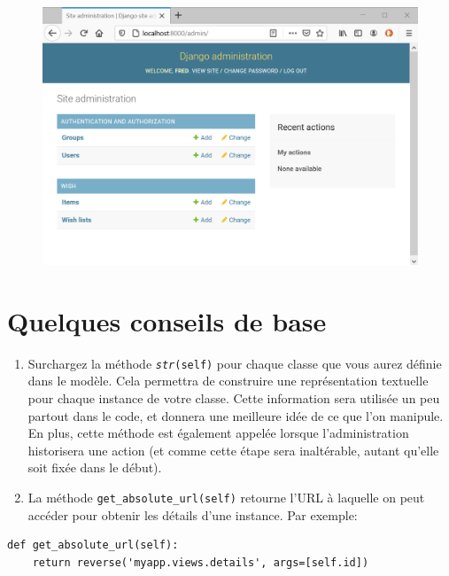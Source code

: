 \documentclass[11pt]{amsbook}
\begin{document}
\begin{figure}[h]{}
\centering\includegraphics[width=2.5truein]{images/django/django-site-admin-after-connection.png}
\caption{}
\centering
\end{figure}

\hypertarget{x-quelques-conseils-de-base}{\section{Quelques conseils de base}}
\begin{enumerate}

\item{Surchargez la méthode \texttt{\emph{str}(self)} pour chaque classe que vous aurez définie dans le modèle. Cela permettra de construire une représentation textuelle pour chaque instance de votre classe. Cette information sera utilisée un peu partout dans le code, et donnera une meilleure idée de ce que l’on manipule. En plus, cette méthode est également appelée lorsque l’administration historisera une action (et comme cette étape sera inaltérable, autant qu’elle soit fixée dans le début).}

\item{La méthode \texttt{get\_absolute\_url(self)} retourne l’URL à laquelle on peut accéder pour obtenir les détails d’une instance. Par exemple:}

\end{enumerate}


\begin{verbatim}
def get_absolute_url(self):
    return reverse('myapp.views.details', args=[self.id])
\end{verbatim}
\end{document}
